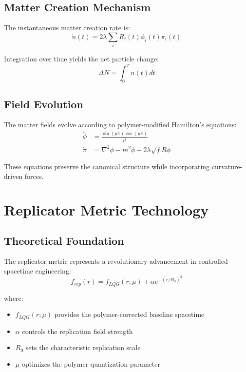 \documentclass[11pt]{article}
\begin{document}
\subsection{Matter Creation Mechanism}

The instantaneous matter creation rate is:
\begin{equation}
\dot{n}(t) = 2\lambda \sum_i R_i(t) \phi_i(t) \pi_i(t)
\end{equation}

Integration over time yields the net particle change:
\begin{equation}
\Delta N = \int_0^T \dot{n}(t) dt
\end{equation}

\subsection{Field Evolution}

The matter fields evolve according to polymer-modified Hamilton's equations:
\begin{align}
\dot{\phi} &= \frac{\sin(\mu\pi)\cos(\mu\pi)}{\mu} \\
\dot{\pi} &= \nabla^2\phi - m^2\phi - 2\lambda\sqrt{f}R\phi
\end{align}

These equations preserve the canonical structure while incorporating curvature-driven forces.

\section{Replicator Metric Technology}

\subsection{Theoretical Foundation}

The replicator metric represents a revolutionary advancement in controlled spacetime engineering:
\begin{equation}
f_{rep}(r) = f_{LQG}(r;\mu) + \alpha e^{-(r/R_0)^2}
\end{equation}

where:
\begin{itemize}
\item $f_{LQG}(r;\mu)$ provides the polymer-corrected baseline spacetime
\item $\alpha$ controls the replication field strength
\item $R_0$ sets the characteristic replication scale
\item $\mu$ optimizes the polymer quantization parameter
\end{itemize}
\end{document}
